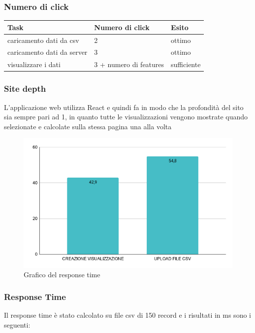 \subsubsection{Numero di click}

\begin{longtabu} to \textwidth {| X[0.2,c m] | X[0.1,c m]| X[0.1,c m]| }
    \hline
    \textbf{Task} &
    \textbf{Numero di click} &
    \textbf{Esito}\\
    \hline
    caricamento dati da csv & 2 & ottimo \\ 
    \hline
    caricamento dati da server & 3 & ottimo \\
    \hline
    visualizzare i dati & 3 + numero di features & sufficiente \\
    \hline 
    \end{longtabu}


\subsubsection{Site depth}
    L'applicazione web utilizza React e quindi fa in modo che la profondità del sito sia sempre pari ad 1, in quanto tutte le visualizzazioni vengono mostrate quando selezionate e calcolate sulla stessa pagina una alla volta

    \begin{figure}[H]
        \centering
        \includegraphics[width=10 cm]{source/sections/images/response-time.png}
        \caption{Grafico del response time}
    \end{figure}
    
\subsubsection{Response Time}
    Il response time è stato calcolato su file csv di 150 record e i risultati in ms sono i seguenti:

